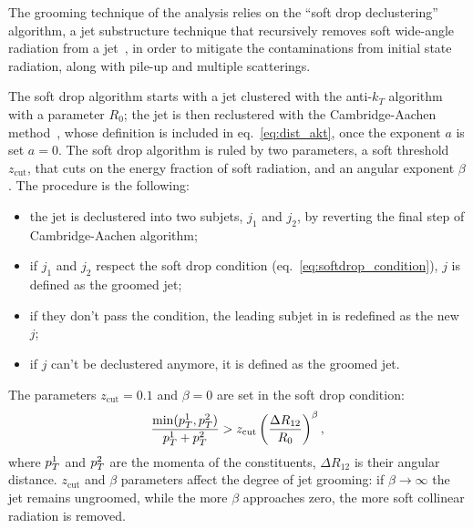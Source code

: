 \noindent The grooming technique of the analysis relies on the ``soft drop declustering'' algorithm, a jet substructure technique that recursively removes soft wide-angle radiation from a jet~\cite{Larkoski:2014wba}, in order to mitigate the contaminations from initial state radiation, along with pile-up and multiple scatterings.

\noindent The soft drop algorithm starts with a jet clustered with the anti-$k_T$ algorithm with a parameter $R_0$; the jet is then reclustered with the Cambridge-Aachen method~\cite{Dokshitzer:1997in}, whose definition is included in eq.~\ref{eq:dist_akt}, once the exponent $a$ is set $a=0$. The soft drop algorithm is ruled by two parameters, a soft threshold $z_{\text{cut}}$, that cuts on the energy fraction of soft radiation, and an angular exponent $\beta$. The procedure is the following:
\begin{itemize}
\item the jet is declustered into two subjets, $j_1$ and $j_2$, by reverting the final step of Cambridge-Aachen algorithm;
\item if $j_1$ and $j_2$ respect the soft drop condition (eq.~\ref{eq:softdrop_condition}), $j$ is defined as the groomed jet;
\item if they don't pass the condition, the leading subjet in \pt is redefined as the new $j$;
\item if $j$ can't be declustered anymore, it is defined as the groomed jet.
\end{itemize}

\noindent The parameters $z_{\text{cut}} = 0.1$ and $\beta = 0$ are set in the soft drop condition:
\begin{equation}
\frac{\min(p_T^1,p_T^2)}{p_T^1+p_T^2} > z_{\text{cut}} \left( \frac{\Delta R_{12}}{R_0} \right)^\beta,
\label{eq:softdrop_condition}
\end{equation}
\noindent where $p_T^1$ and $p_T^2$ are the momenta of the constituents, $\Delta R_{12}$ is their angular distance. $z_{\text{cut}}$ and $\beta$ parameters affect the degree of jet grooming: if $\beta \to \infty$ the jet remains ungroomed, while the more $\beta$ approaches zero, the more soft collinear radiation is removed. %

